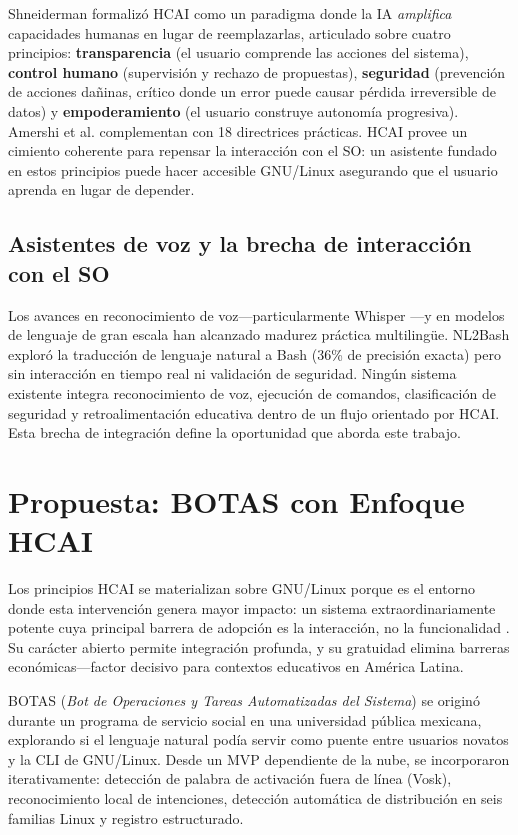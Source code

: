 \documentclass[12pt]{article}
\begin{document}
\noindent
Shneiderman \cite{Shneiderman2020, Shneiderman2022} formalizó HCAI como un
paradigma donde la IA \textit{amplifica} capacidades humanas en lugar de
reemplazarlas, articulado sobre cuatro principios: \textbf{transparencia} (el
usuario comprende las acciones del sistema), \textbf{control humano} (supervisión
y rechazo de propuestas), \textbf{seguridad} (prevención de acciones dañinas,
crítico donde un error puede causar pérdida irreversible de datos) y
\textbf{empoderamiento} (el usuario construye autonomía progresiva). Amershi et al.
\cite{Amershi2019} complementan con 18 directrices prácticas. HCAI provee un
cimiento coherente para repensar la interacción con el SO: un asistente fundado en
estos principios puede hacer accesible GNU/Linux asegurando que el usuario aprenda
en lugar de depender.

\subsection{Asistentes de voz y la brecha de interacción con el SO}
\label{subsec:voice-gap}

\noindent
Los avances en reconocimiento de voz---particularmente Whisper
\cite{Radford2022}---y en modelos de lenguaje de gran escala
\cite{Brown2020, OpenAI2023} han alcanzado madurez práctica multilingüe. NL2Bash
\cite{Lin2018} exploró la traducción de lenguaje natural a Bash (36\% de precisión
exacta) pero sin interacción en tiempo real ni validación de seguridad. Ningún
sistema existente integra reconocimiento de voz, ejecución de comandos,
clasificación de seguridad y retroalimentación educativa dentro de un flujo
orientado por HCAI. Esta brecha de integración define la oportunidad que aborda
este trabajo.


\section{Propuesta: BOTAS con Enfoque HCAI}
\label{sec:proposal}

\noindent
Los principios HCAI se materializan sobre GNU/Linux porque es el entorno donde
esta intervención genera mayor impacto: un sistema extraordinariamente potente cuya
principal barrera de adopción es la interacción, no la funcionalidad
\cite{Warschauer2004}. Su carácter abierto permite integración profunda, y su
gratuidad elimina barreras económicas---factor decisivo para contextos educativos
en América Latina.

BOTAS (\textit{Bot de Operaciones y Tareas Automatizadas del Sistema}) se originó
durante un programa de servicio social en una universidad pública mexicana,
explorando si el lenguaje natural podía servir como puente entre usuarios novatos
y la CLI de GNU/Linux. Desde un MVP dependiente de la nube, se incorporaron
iterativamente: detección de palabra de activación fuera de línea (Vosk),
reconocimiento local de intenciones, detección automática de distribución en
seis familias Linux y registro estructurado.
\end{document}
